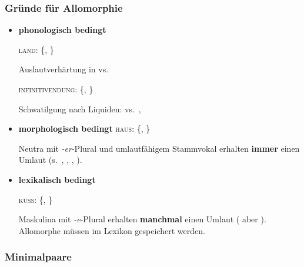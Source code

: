 \begin{frame}
\frametitle{Gründe für Allomorphie}

\begin{itemize}
	\item \textbf{phonologisch bedingt} 
	
	\ea 
	
	\ea \textsc{land}: \{, \}

	Auslautverhärtung in  vs. 
	
	\ex \textsc{infinitivendung}: \{\textipa{[n]}, \textipa{[\alertred{@}n]}\}
	
	Schwatilgung nach Liquiden:  vs.\ , 
	\z
	\z 

\pause 

	\item \textbf{morphologisch bedingt}
	\ea \textsc{haus}: \{\textipa{[h\alertred{\t{aU}}s]}, \textipa{[h\alertred{\t{O}I}s]}\}
	
	Neutra mit \emph{-er}-Plural und umlautfähigem Stammvokal erhalten \textbf{immer} einen Umlaut (s.\ , , , ).
	\z 

\pause 

	\item \textbf{lexikalisch bedingt}
	
	\ea \textsc{kuss}: \{\textipa{[k\alertred{U}s]}, \textipa{[k\alertred{Y}s]}\}
	
	Maskulina mit \emph{-e}-Plural erhalten \textbf{manchmal} einen Umlaut ( aber ). Allomorphe müssen im Lexikon gespeichert werden.
	\z 
	
\end{itemize}

\end{frame}


\subsubsection{Minimalpaare}


